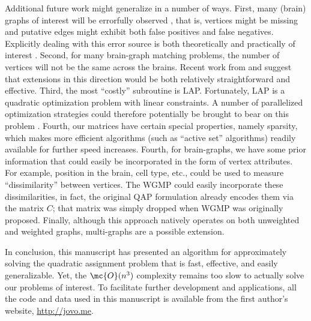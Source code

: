 \documentclass[10pt,journal,cspaper,compsoc]{IEEEtran}
\begin{document}
Additional future work might generalize \faqap in a number of ways.  First, many (brain) graphs of interest will be errorfully observed \cite{Priebe2011}, that is, vertices might be missing and putative edges might exhibit both false positives and false negatives.  Explicitly dealing with this error source is both theoretically and practically of interest \cite{VP11_unlabeled}.  
Second, for many brain-graph matching problems, the number of vertices will not be the same across the brains.  Recent work from \cite{Zaslavskiy2009, Zaslavskiy2010} and \cite{Escolano2011} suggest that extensions in this direction would be both relatively straightforward and effective. Third, the most ``costly'' subroutine is LAP.  Fortunately, LAP is a quadratic optimization problem with linear constraints.  A number of parallelized optimization strategies could therefore potentially be brought to bear on this problem \cite{Boyd2011}.  Fourth, our matrices have certain special properties, namely sparsity, which makes more efficient algorithms (such as ``active set'' algorithms) readily available for further speed increases.  Fourth, for brain-graphs, we have some prior information that could easily be incorporated in the form of vertex attributes.  For example, position in the brain, cell type, etc., could be used to measure ``dissimilarity'' between vertices.  The WGMP could easily incorporate these dissimilarities, in fact, the original QAP formulation already encodes them via the matrix $C$; that matrix was simply dropped when WGMP was originally proposed.  
Finally, although this approach natively operates on both unweighted and weighted graphs, multi-graphs are a possible extension.

In conclusion, this manuscript has presented an algorithm for approximately solving the quadratic assignment problem that is fast, effective, and easily generalizable.  Yet, the $\mc{O}(n^3)$ complexity remains too slow to actually solve our problems of interest.  To facilitate further development and applications, all the code and data used in this manuscript is available from the first author's website, \url{http://jovo.me}.
\end{document}
